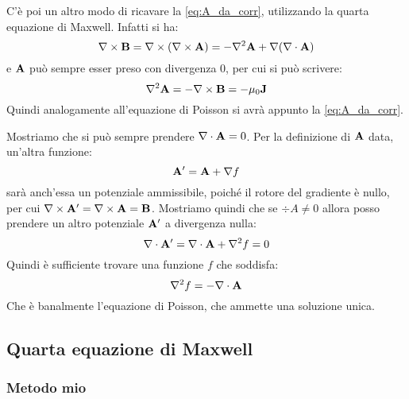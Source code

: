 C'è poi un altro modo di ricavare la \ref{eq:A_da_corr}, utilizzando la quarta equazione di Maxwell. Infatti si ha:
\begin{equation}
    \nabla \times \mathbf B = \nabla \times (\nabla \times \mathbf A) = -\nabla^2 \mathbf A + \nabla ( \nabla \cdot \mathbf A )
\end{equation}
e $\mathbf A$ può sempre esser preso con divergenza 0, per cui si può scrivere:
\begin{equation}
    \nabla^2 \mathbf A = - \nabla \times \mathbf B = - \mu_0 \mathbf J
\end{equation}
Quindi analogamente all'equazione di Poisson si avrà appunto la \ref{eq:A_da_corr}. 

Mostriamo che si può sempre prendere $\nabla \cdot \mathbf A = 0$. Per la definizione di $\mathbf A$ data, un'altra funzione:
\begin{equation}
    \mathbf A' = \mathbf A + \nabla f
\end{equation}
sarà anch'essa un potenziale ammissibile, poiché il rotore del gradiente è nullo, per cui $\nabla \times \mathbf A' = \nabla \times \mathbf A = \mathbf B$. Mostriamo quindi che se $\div A \neq 0$ allora posso prendere un altro potenziale $\mathbf A'$ a divergenza nulla:
\begin{equation}
    \nabla \cdot \mathbf A' = \nabla \cdot \mathbf A + \nabla^2 f = 0
\end{equation}
Quindi è sufficiente trovare una funzione $f$ che soddisfa:
\begin{equation}
    \nabla^2 f = - \nabla \cdot \mathbf A
\end{equation}
Che è banalmente l'equazione di Poisson, che ammette una soluzione unica. 


\subsection{Quarta equazione di Maxwell} %
\label{sub:quarta_equazione_di_maxwell}

\subsubsection{Metodo mio} %
\label{ssub:metodo_mio}

